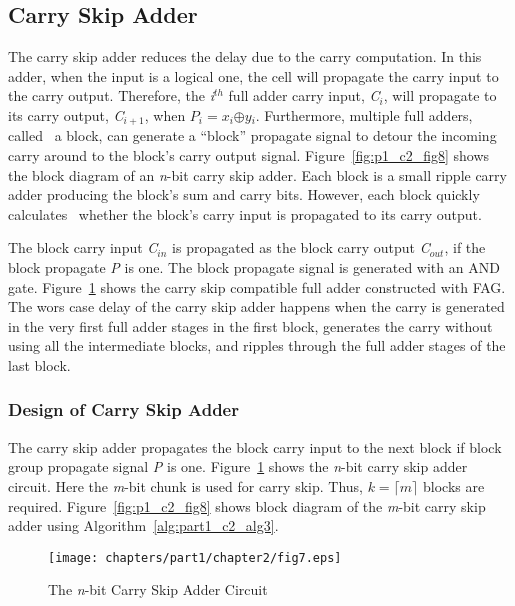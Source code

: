 \subsection{Carry Skip Adder}
The carry skip adder reduces the delay due to the carry computation. In this adder, when the input is a logical one, the cell will propagate the carry input to the carry output. Therefore, the {\it i${}^{th}$} full adder carry input, {\it C${}_{i}$}, will propagate to its carry output, {\it C${}_{i+1}$}, when {\it $P_i = x{}_{i}$$\oplus $$y{}_{i}$}. Furthermore, multiple full adders, called~ a block, can generate a ``block'' propagate signal to detour the incoming carry around to the block's carry output signal. Figure~\ref{fig:p1_c2_fig8} shows the block diagram of an {\it n}-bit carry skip adder. Each block is a small ripple carry adder producing the block's sum and carry bits. However, each block quickly~ calculates~ whether the block's carry input is propagated to its carry output.

The block carry input {\it C${}_{in}$} is propagated as the block carry output {\it C${}_{out}$}, if the block propagate {\it P} is one. The block propagate signal is generated with an AND gate. Figure~\ref{fig:p1_c2_fig7} shows the carry skip compatible full adder constructed with FAG. The wors case delay of the carry skip adder happens when the carry is generated in the very first full adder stages in the first block, generates the carry without using all the intermediate blocks, and ripples through the full adder stages of the last block.

\subsubsection{Design of Carry Skip Adder}
The carry skip adder propagates the block carry input to the next block if block group propagate signal {\it P} is one. Figure~\ref{fig:p1_c2_fig7} shows the {\it n}-bit carry skip adder circuit. Here the {\it m}-bit chunk is used for carry skip. Thus, $k=\lceil{m}\rceil$ blocks are required. Figure~\ref{fig:p1_c2_fig8} shows block diagram of the \textit{m}-bit carry skip adder using Algorithm~\ref{alg:part1_c2_alg3}.

\begin{figure}[!tbh]
\centering
\texttt{[image: chapters/part1/chapter2/fig7.eps]}
\caption{The {\it n}-bit Carry Skip Adder Circuit}
\label{fig:p1_c2_fig7}
\end{figure}


